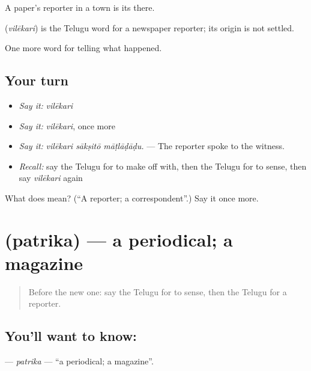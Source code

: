 A paper's reporter in a town is its  there.

\begin{cousinweb}
\textbf{} (\emph{vilēkari}) is the Telugu word for a newspaper reporter; its origin is not settled.
\end{cousinweb}

\begin{grammarlens}[title={What you've built}]
One more word for telling what happened.
\end{grammarlens}

\subsection*{Your turn}
\begin{itemize}
\raggedright
  \item \emph{Say it:} \emph{vilēkari}
  \item \emph{Say it:} \emph{vilēkari}, once more
  \item \emph{Say it:} \emph{vilēkari sākṣitō māṭlāḍāḍu.} — The reporter spoke to the witness.
  \item \emph{Recall:} say the Telugu for to make off with, then the Telugu for to sense, then say \emph{vilēkari} again
\end{itemize}

\begin{tcolorbox}[breakable,colback=teal!4,colframe=teal!35!black,title={Before you move on}]
What does  mean? (\textquotedblleft{}A reporter; a correspondent\textquotedblright{}.) Say it once more.
\end{tcolorbox}
\section[\texorpdfstring{\te{పత్రిక} (patrika)}{పత్రిక (patrika)}]{ (patrika) — a periodical; a magazine}

\label{lesson:TE-C330-patrika}



\begin{quote}
Before the new one: say the Telugu for to sense, then the Telugu for a reporter.
\end{quote}

\subsection*{You'll want to know: }
\textbf{} — \emph{patrika} — \textquotedblleft{}a periodical; a magazine\textquotedblright{}.

